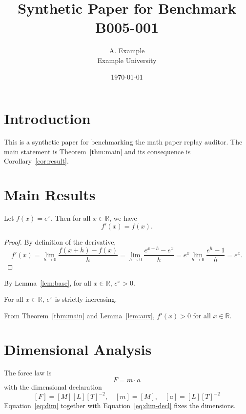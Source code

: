 \documentclass{article}
\title{Synthetic Paper for Benchmark B005-001}
\author{A. Example \\ Example University}
\date{\today}
\begin{document}
\maketitle

\section{Introduction}
This is a synthetic paper for benchmarking the math paper replay auditor.
The main statement is Theorem~\ref{thm:main} and its consequence is
Corollary~\ref{cor:result}.

\section{Main Results}
\begin{theorem}
\label{thm:main}
Let $f(x) = e^x$. Then for all $x \in \mathbb{R}$, we have
\begin{equation}
\label{eq:main}
f'(x) = f(x).
\end{equation}
\end{theorem}

\begin{proof}
By definition of the derivative,
\begin{equation}
\label{eq:deriv}
f'(x) = \lim_{h \to 0} \frac{f(x+h) - f(x)}{h} = \lim_{h \to 0} \frac{e^{x+h} - e^x}{h} = e^x \lim_{h \to 0} \frac{e^h - 1}{h} = e^x.
\end{equation}
\end{proof}

\begin{lemma}
\label{lem:aux}
By Lemma~\ref{lem:base}, for all $x \in \mathbb{R}$, $e^x > 0$.
\end{lemma}

\begin{lemma}
For all $x \in \mathbb{R}$, $e^x$ is strictly increasing.
\end{lemma}

\begin{corollary}
\label{cor:result}
From Theorem~\ref{thm:main} and Lemma~\ref{lem:aux}, $f'(x) > 0$ for all $x \in \mathbb{R}$.
\end{corollary}

\section{Dimensional Analysis}
The force law is
\begin{equation}
\label{eq:dim}
F = m \cdot a
\end{equation}
with the dimensional declaration
\begin{equation}
\label{eq:dim-decl}
[F] = [M][L][T]^{-2}, \quad [m] = [M], \quad [a] = [L][T]^{-2}
\end{equation}
Equation~\ref{eq:dim} together with Equation~\ref{eq:dim-decl} fixes the dimensions.
\end{document}
